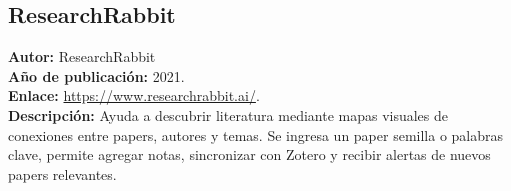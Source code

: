 \subsection{ResearchRabbit}
\textbf{Autor:} ResearchRabbit\\
\textbf{Año de publicación:} 2021.\\
\textbf{Enlace:} \url{https://www.researchrabbit.ai/}.\\
\textbf{Descripción:} Ayuda a descubrir literatura mediante mapas visuales de conexiones entre papers, autores y temas. Se ingresa un paper semilla o palabras clave, permite agregar notas, sincronizar con Zotero y recibir alertas de nuevos papers relevantes.